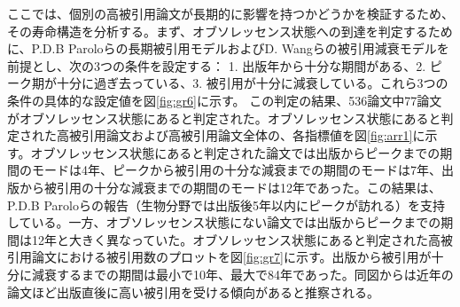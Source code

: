 ここでは、個別の高被引用論文が長期的に影響を持つかどうかを検証するため、その寿命構造を分析する。まず、オブソレッセンス状態への到達を判定するために、P.D.B Paroloら\cite{Par1}の長期被引用モデルおよびD. Wangら\cite{Wan1}の被引用減衰モデルを前提とし、次の3つの条件を設定する： 1. 出版年から十分な期間がある、2. ピーク期が十分に過ぎ去っている、3. 被引用が十分に減衰している。これら3つの条件の具体的な設定値を図\ref{fig:gr6}に示す。
この判定の結果、536論文中77論文がオブソレッセンス状態にあると判定された。オブソレッセンス状態にあると判定された高被引用論文および高被引用論文全体の、各指標値を図\ref{fig:arr1}に示す。オブソレッセンス状態にあると判定された論文では出版からピークまでの期間のモードは4年、ピークから被引用の十分な減衰までの期間のモードは7年、出版から被引用の十分な減衰までの期間のモードは12年であった。この結果は、P.D.B Paroloらの報告（生物分野では出版後5年以内にピークが訪れる）を支持している。一方、オブソレッセンス状態にない論文では出版からピークまでの期間は12年と大きく異なっていた。オブソレッセンス状態にあると判定された高被引用論文における被引用数のプロットを図\ref{fig:gr7}に示す。出版から被引用が十分に減衰するまでの期間は最小で10年、最大で84年であった。同図からは近年の論文ほど出版直後に高い被引用を受ける傾向があると推察される。

